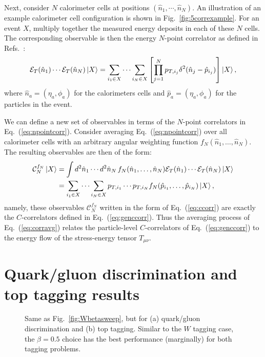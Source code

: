 \documentclass[letterpaper,11pt]{article}
\DeclareRobustCommand{\Fig}[1]{Fig.~\ref{#1}}
\DeclareRobustCommand{\Eq}[1]{Eq.~(\ref{#1})}
\DeclareRobustCommand{\Refs}[1]{Refs.~\cite{#1}}
\begin{document}
Next, consider $N$ calorimeter cells at positions $(\hat n_1, \cdots, \hat n_N)$. 
%
An illustration of an example calorimeter cell configuration is shown in \Fig{fig:5correxample}. 
%
For an event $X$, multiply together the measured energy deposits in each of these $N$ cells. 
%
The corresponding observable is then the energy $N$-point correlator as defined in \Refs{basham1978energy,basham1979energy}:
\begin{equation}\label{eq:npointcorr}
\mathcal E_T(\hat n_1) \cdots \mathcal E_T(\hat n_N)\ket X = \sum_{i_1 \in X} \cdots \sum_{i_N \in X} \left[\prod_{j=1}^Np_{T,i_j}\delta^2(\hat n_j-\hat p_{i_j})\right]\ket X,
\end{equation}
where $\hat n_a=( \eta_a,\phi_a)$ for the calorimeters cells and $\hat p_a=( \eta_a,\phi_a)$ for the particles in the event.

We can define a new set of observables in terms of the $N$-point correlators in \Eq{eq:npointcorr}. 
%
Consider averaging \Eq{eq:npointcorr} over all calorimeter cells with an arbitrary angular weighting function $f_N(\hat n_1,\ldots,\hat n_N)$. 
%
The resulting observables are then of the form:
\begin{align}\label{eq:corravg}
\mathcal C_N^{f_N} \ket X &= \int d^2\hat n_1 \cdots d^2 \hat n_N \, f_N(\hat n_1,\ldots, \hat n_N)\mathcal E_T(\hat n_1) \cdots \mathcal E_T(\hat n_N) \ket X
\\& = \sum_{i_1\in X} \cdots \sum_{i_N \in X} p_{T,i_1} \cdots p_{T,i_N} f_N(\hat p_{i_1},\ldots, \hat p_{i_N})\ket X,\label{eq:ccorr}
\end{align}
namely, these observables $\mathcal C_N^{f_N}$ written in the form of \Eq{eq:ccorr} are exactly the $C$-correlators defined in \Eq{eq:genccorr}. 
%
Thus the averaging process of \Eq{eq:corravg} relates the particle-level $C$-correlators of \Eq{eq:genccorr} to the energy flow of the stress-energy tensor $T_{\mu\nu}$.


\section{Quark/gluon discrimination and top tagging results}
\label{app:moretagging}

\begin{figure}[t]
\centering
{}
\caption{Same as \Fig{fig:Wbetasweep}, but for (a) quark/gluon discrimination and (b) top tagging.  Similar to the $W$ tagging case, the $\beta = 0.5$ choice has the best performance (marginally) for both tagging problems.}
\label{fig:appbetasweep}
\end{figure}
\end{document}
